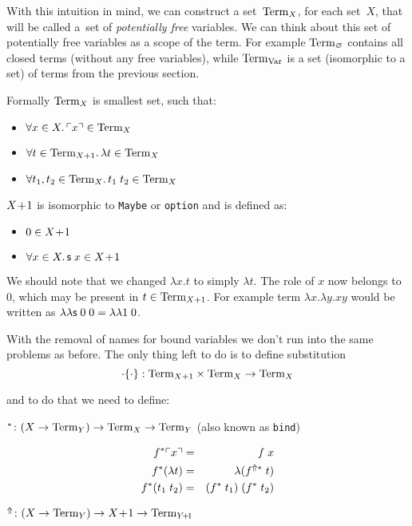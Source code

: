 With this intuition in mind, we can construct a set~$\mathrm{Term}_{X}$,
for each set~$X$, that will be called a~set of
\emph{potentially free} variables.
We can think about this set of potentially free variables
as a scope of the term.
For example $\mathrm{Term}_{\varnothing}$ contains all closed terms
(without any free variables),
while $\mathrm{Term}_{\mathrm{Var}}$ is a set (isomorphic to a set)
of terms from the previous section.

Formally $\mathrm{Term}_{X}$ is smallest set, such that:

\begin{itemize}
\item $\forall x \in X\ldotp \ulcorner x \urcorner \in \mathrm{Term}_{X}$
\item $\forall t \in \mathrm{Term}_{X+1}\ldotp \lambda t \in \mathrm{Term}_{X}$
\item $\forall t_1, t_2 \in \mathrm{Term}_{X}\ldotp t_1\;t_2 \in \mathrm{Term}_{X}$
\end{itemize}

$X\!+\!1$ is isomorphic to \texttt{Maybe} or \texttt{option}
and is defined as:

\begin{itemize}
\item $0 \in X\!+\!1$
\item $\forall x \in X\ldotp \mathsf{s}\;x \in X\!+\!1$
\end{itemize}

We should note that we changed $\lambda x.t$ to simply $\lambda t$.
The role of $x$ now belongs to 0, which may be present in $t \in \mathrm{Term}_{X+1}$.
For example term $\lambda x.\lambda y. xy$
would be written as $\lambda\lambda \mathsf{s}\;0\;0 = \lambda\lambda 1\;0$.

With the removal of names for bound variables we don't run into the same problems as before.
The only thing left to do is to define substitution
\[
	\cdot\{\cdot\}:
  \mathrm{Term}_{X+1} \times \mathrm{Term}_{X} \to \mathrm{Term}_{X}
\]

and to do that we need to define:

$^* \colon (X \to \mathrm{Term}_{Y}) \to \mathrm{Term}_{X} \to \mathrm{Term}_{Y}$ (also known as \texttt{bind})

\begin{eqnarray*}
  f^*\ulcorner x \urcorner   & = & f\;x \\
  f^*(\lambda t) & = & \lambda (f^{\Uparrow*} \; t) \\
  f^*(t_1\;t_2)  & = & (f^* \; t_1) \; (f^* \; t_2)
\end{eqnarray*}

$^\Uparrow \colon (X \to \mathrm{Term}_{Y}) \to X\!+\!1 \to \mathrm{Term}_{Y\!+\!1}$


